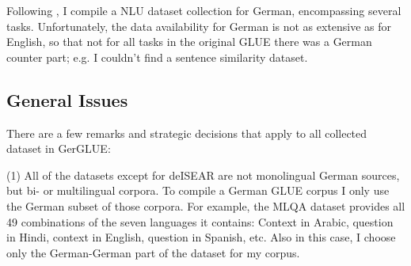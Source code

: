 Following \cite{wang2018glue}, I compile a NLU dataset collection for German, encompassing several
tasks. Unfortunately, the data availability for German is not as extensive as for English, so that
not for all tasks in the original GLUE there was a German counter part; e.g. I couldn't find a sentence
similarity dataset.


\subsection{General Issues}

There are a few remarks and strategic decisions that apply to all collected dataset in GerGLUE:

(1) All of the datasets except for deISEAR are not monolingual German sources, but bi- or
multilingual corpora. To compile a German GLUE corpus I only use the German subset of those
corpora. For example, the MLQA dataset provides all 49 combinations of the seven languages
it contains: Context in Arabic, question in Hindi, context in English, question in Spanish,
etc. Also in this case, I choose only the German-German part of the dataset for my corpus.

